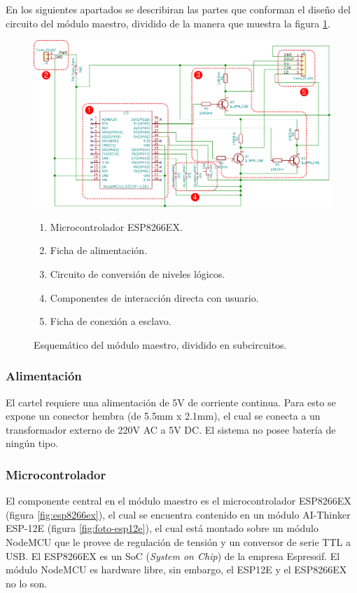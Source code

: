 En los siguientes apartados se describiran las partes que conforman el diseño del circuito del módulo maestro, dividido de la manera que muestra la figura \ref{fig:esquematico-master-anotado}.

\begin{figure}[ht!]
	\centering
	\includegraphics[width=\linewidth]{imagenes/esquematico-master-anotado.pdf}
	\caption{Esquemático del módulo maestro, dividido en subcircuitos.}
	\label{fig:esquematico-master-anotado}
	\begin{enumerate}
		\item Microcontrolador ESP8266EX.
		\item Ficha de alimentación.
		\item Circuito de conversión de niveles lógicos.
		\item Componentes de interacción directa con usuario.
		\item Ficha de conexión a esclavo.
	\end{enumerate}
\end{figure}

\subsubsection{Alimentación} \label{sec:alimentacion}
El cartel requiere una alimentación de 5V de corriente continua. Para esto se expone un conector hembra (de 5.5mm x 2.1mm), el cual se conecta a un transformador externo de 220V AC a 5V DC. El sistema no posee batería de ningún tipo.

\subsubsection{Microcontrolador} \label{sec:microcontrolador}
El componente central en el módulo maestro es el microcontrolador ESP8266EX (figura \ref{fig:esp8266ex}), el cual se encuentra contenido en un módulo AI-Thinker ESP-12E (figura \ref{fig:foto-esp12e}), el cual está montado sobre un módulo NodeMCU que le provee de regulación de tensión y un conversor de serie TTL a USB. El ESP8266EX es un SoC (\emph{System on Chip}) de la empresa Espressif. El módulo NodeMCU es hardware libre, sin embargo, el ESP12E y el ESP8266EX no lo son.\cite{NodeMCU}

